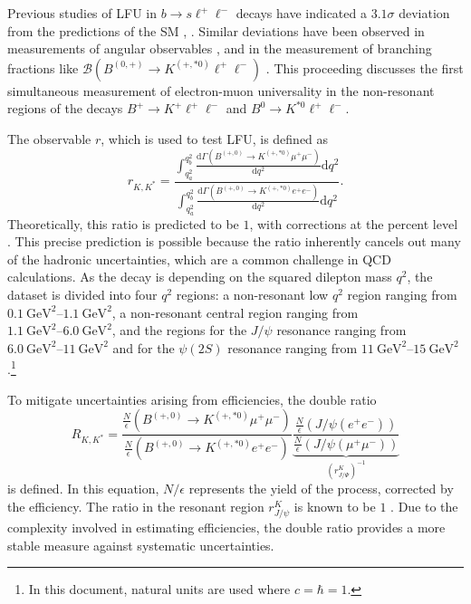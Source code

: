 Previous studies of LFU in $b\to s\ell^+\ell^-$ decays have indicated a $\num{3.1}\sigma$ 
deviation from the predictions of the SM \cite{previous_RK}, \cite{previous_RK*}. 
Similar deviations have been observed in measurements of angular observables \cite{angular_1}, 
\cite{angular_2} and in the measurement of branching fractions like 
$\mathcal{B}(B^{(0,+)}\to K^{(+,*0)}\ell^+\ell^-)$ \cite{Branchingfraction}. 
This proceeding discusses the first simultaneous measurement of electron-muon 
universality in the non-resonant regions of the decays $B^+\to K^+\ell^+\ell^-$ and $B^0\to K^{*0}\ell^+\ell^-$.

The observable $r$, which is used to test LFU, is defined as
\begin{equation}
    r_{K,K^*}= 
    \frac{\int_{q_a^2}^{q_b^2}\frac{\mathrm{d}\Gamma(B^{(+,0)}\to K^{(+,*0)}\mu^+\mu^-)}{\mathrm{d}q^2}\mathrm{d}q^2}
    {\int_{q_a^2}^{q_b^2}\frac{\mathrm{d}\Gamma(B^{(+,0)}\to K^{(+,*0)}e^+e^-)}{\mathrm{d}q^2}\mathrm{d}q^2} .
    \label{eqn:single_ratio}
\end{equation}
Theoretically, this ratio is predicted to be $\num{1}$, with corrections at 
the percent level \cite{LU_theo}. This precise prediction is possible because the ratio inherently 
cancels out many of the hadronic uncertainties, which are a common challenge in QCD calculations.
As the decay is depending on the squared dilepton mass $q^2$, the dataset is divided into four $q^2$ regions:
a non-resonant low $q^2$ region ranging from
$\SIrange{0.1}{1.1}{\giga\electronvolt\squared}$,
a non-resonant central region ranging from
$\SIrange{1.1}{6.0}{\giga\electronvolt\squared}$,
and the regions for the $J\!/\!\psi$ resonance ranging from 
$\SIrange{6.0}{11}{\giga\electronvolt\squared}$
and for the $\psi(2S)$ resonance ranging from
$\SIrange{11}{15}{\giga\electronvolt\squared}$.\footnote{In this document, natural units are used where $c=\hbar=1$.}

To mitigate uncertainties arising from efficiencies, the double ratio 
\begin{equation}
    R_{K,K^*}= 
    \frac{\frac{N}{\epsilon}(B^{(+,0)}\to K^{(+,*0)}\mu^+\mu^-)}
    {\frac{N}{\epsilon}(B^{(+,0)}\to K^{(+,*0)}e^+e^-)}
    \underbrace{\frac{\frac{N}{\epsilon}(J\!/\!\psi(e^+e^-))}{\frac{N}{\epsilon}(J\!/\!\psi(\mu^+\mu^-))}}_{(r^K_{J\!/\!\Psi})^{-1}}
    \label{eqn:double_ratio}
\end{equation}
is defined.
In this equation, $N/\epsilon$ represents the yield of the process, corrected by 
the efficiency. The ratio in the resonant region $r^K_{J\!/\!\psi}$ is known to be 
$\num{1}$ \cite{AULCHENKO2014227}. Due to the complexity involved in estimating 
efficiencies, the double ratio provides a more stable measure against systematic 
uncertainties.

